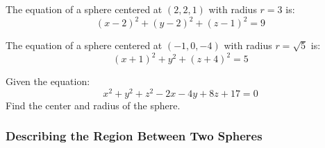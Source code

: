 \documentclass{article}
\begin{document}
\begin{examplebox}
    The equation of a sphere centered at \( (2,2,1) \) with radius \( r = 3 \) is:
    \[
        (x - 2)^2 + (y - 2)^2 + (z - 1)^2 = 9
    \]
\end{examplebox}

\begin{examplebox}
    The equation of a sphere centered at \( (-1,0,-4) \) with radius \( r = \sqrt{5} \) is:
    \[
        (x + 1)^2 + y^2 + (z + 4)^2 = 5
    \]
\end{examplebox}

\begin{exercisebox}
    Given the equation:
    \[
        x^2 + y^2 + z^2 - 2x - 4y + 8z + 17 = 0
    \]
    Find the center and radius of the sphere.
\end{exercisebox}

\subsubsection*{Describing the Region Between Two Spheres}
\end{document}
